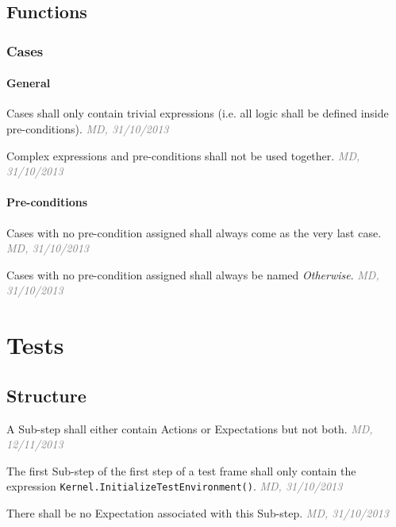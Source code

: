 \documentclass[draft, a4paper, oneside]{scrreprt}
\let\emph\textsl
\newcommand{\literally}[1]{\textsf{\emph{#1}}}
\newcommand{\code}[1]{\lstinline$#1$}
\newcommand{\ruleauthor}[2]{\mbox{}\newline\mbox{}\hfill{\footnotesize\textcolor{gray}{\emph{#1, #2}}}\xspace}}
\newcommand{\ruleauthor}[2]{}
\begin{document}
\section{Functions}
\subsection{Cases}

\subsubsection{General}
\begin{rules}
\item \label{rule:functions_cases_general_trivialexpressions} Cases shall only contain trivial expressions (i.e. all logic shall be defined inside pre-conditions). \ruleauthor{MD}{31/10/2013}
\item {} Complex expressions and pre-conditions shall not be used together.  \ruleauthor{MD}{31/10/2013}
\end{rules}

\subsubsection{Pre-conditions}
\begin{rules}
\item Cases with no pre-condition assigned shall always come as the very last case. \ruleauthor{MD}{31/10/2013}
\item Cases with no pre-condition assigned shall always be named \literally{Otherwise}. \ruleauthor{MD}{31/10/2013}
\end{rules}

\chapter{Tests}

\section{Structure}
\begin{rules}
\item {} A Sub-step shall either contain Actions or Expectations but not both. \ruleauthor{MD}{12/11/2013}
\item The first Sub-step of the first step of a test frame shall only contain the expression \code{Kernel.InitializeTestEnvironment()}. \ruleauthor{MD}{31/10/2013}
\begin{rules}
\item There shall be no Expectation associated with this Sub-step. \ruleauthor{MD}{31/10/2013}
\end{rules}
\end{rules}
\end{document}
